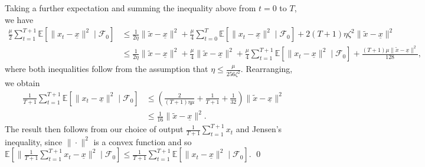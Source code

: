 \documentclass[11pt,twoside]{article}
\numberwithin{equation}{section}
\newcommand{\EE}{\mathbb{E}}
\newcommand{\1}{\mathbf{1}}
\newcommand{\cF}{\mathcal{F}}
\theoremstyle{remark}
\theoremstyle{plain}
\begin{document}
Taking a further expectation and summing the inequality above from $t= 0$ to $T$, we have
\begin{align*}
\frac{\mu}{2}\sum_{t=1}^{T+1} \EE[ \|x_t - \underline{x}\|^2 \mid \cF_0] &\le  \frac{1}{2\eta} \|\tilde x - \underline{x}\|^2 + \frac{\mu}{4} \sum_{t=0}^{T} \EE[\|x_t -\underline{x}\|^2 \mid \cF_0] + 2(T +1) \eta\zeta^2 \|\tilde x - \underline{x}\|^2 \\
&\le \frac{1}{2\eta} \|\tilde x - \underline{x}\|^2 + \frac{\mu}{4} \| \tilde x - \underline{x}\|^2 + \frac{\mu}{4} \sum_{t=1}^{T+1} \EE[\|x_t -\underline{x}\|^2 \mid \cF_0] + \frac{(T+1) \mu \|\tilde x - \underline{x}\|^2}{128},
\end{align*}
where both inequalities follow from the assumption that $\eta \le \frac{\mu  }{256 \zeta^2}$. Rearranging, we obtain
\begin{align*}
\frac{1}{T+1} \sum_{t=1}^{T+1} \EE[\|x_t - \underline{x}\|^2 \mid \cF_0] &\le \left(\frac{2}{(T+1)\eta \mu} + \frac{1}{T+1} + \frac{1}{32}\right)\|\tilde x - \underline{x}\|^2 \\
&\le \frac{1}{16} \|\tilde x -\underline{x}\|^2.
\end{align*}
The result then follows from our choice of output $\frac{1}{T+1} \sum_{t=1}^{T+1} x_t$ and Jensen's inequality, since $\| \cdot \|^2$ is a convex function and so $\EE[\|\frac{1}{T+1} \sum_{t=1}^{T+1} x_t - \underline{x}\|^2 \mid \cF_0] \leq \frac{1}{T+1} \sum_{t=1}^{T+1} \EE[\|x_t - \underline{x}\|^2 \mid \cF_0]$.
\qed
\end{document}

